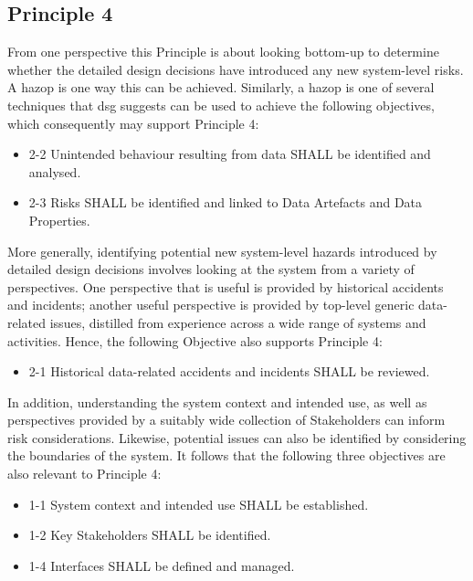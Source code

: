 \subsection{Principle 4}

From one perspective this Principle is about looking bottom-up to determine whether the detailed design decisions have introduced any new system-level risks. A \gls{hazop} is one way this can be achieved. Similarly, a \gls{hazop} is one of several techniques that \gls{dsg} suggests can be used to achieve the following objectives, which consequently may support Principle 4:

\begin{itemize}
	\item \textcolor{dsiwgAccentColour}{2-2} Unintended behaviour resulting from data SHALL be identified and analysed.
	\item \textcolor{dsiwgAccentColour}{2-3} Risks SHALL be identified and linked to \glspl{Data Artefact} and Data Properties.
\end{itemize}

More generally, identifying potential new system-level hazards introduced by detailed design decisions involves looking at the system from a variety of perspectives. One perspective that is useful is provided by historical accidents and incidents; another useful perspective is provided by top-level generic data-related issues, distilled from experience across a wide range of systems and activities. Hence, the following Objective also supports Principle 4:

\begin{itemize}
	\item \textcolor{dsiwgAccentColour}{2-1} Historical data-related accidents and incidents SHALL be reviewed.
\end{itemize}

In addition, understanding the system context and intended use, as well as perspectives provided by a suitably wide collection of Stakeholders can inform risk considerations. Likewise, potential issues can also be identified by considering the boundaries of the system. It follows that the following three objectives are also relevant to Principle 4:

\begin{itemize}
	\item \textcolor{dsiwgAccentColour}{1-1} System context and intended use SHALL be established.
	\item \textcolor{dsiwgAccentColour}{1-2} Key Stakeholders SHALL be identified.
	\item \textcolor{dsiwgAccentColour}{1-4} Interfaces SHALL be defined and managed.
\end{itemize}


